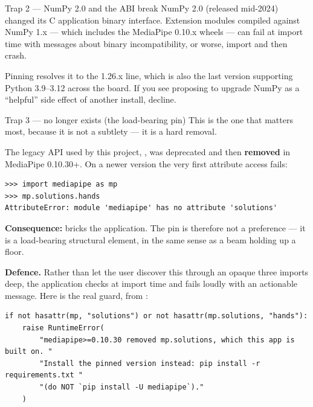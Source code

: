 \begin{edgetrap}{Trap 2 --- NumPy 2.0 and the ABI break}
NumPy 2.0 (released mid-2024) changed its C application binary interface. Extension modules compiled
against NumPy 1.x --- which includes the MediaPipe 0.10.x wheels --- can fail at import time with
messages about binary incompatibility, or worse, import and then crash.

Pinning  resolves it to the 1.26.x line, which is also the last version supporting
Python 3.9--3.12 across the board. If you see  proposing to upgrade NumPy as a
``helpful'' side effect of another install, decline.
\end{edgetrap}

\begin{edgetrap}{Trap 3 ---  no longer exists (the load-bearing pin)}
This is the one that matters most, because it is not a subtlety --- it is a hard removal.

The legacy API used by this project, , was deprecated and then
\textbf{removed} in MediaPipe 0.10.30+. On a newer version the very first attribute access fails:

\begin{lstlisting}
>>> import mediapipe as mp
>>> mp.solutions.hands
AttributeError: module 'mediapipe' has no attribute 'solutions'
\end{lstlisting}

\textbf{Consequence:}  bricks the application. The pin
 is therefore not a preference --- it is a load-bearing structural element,
in the same sense as a beam holding up a floor.

\textbf{Defence.} Rather than let the user discover this through an opaque
 three imports deep, the application checks at import time and fails loudly with
an actionable message. Here is the real guard, from :

\begin{codecard}
\begin{lstlisting}
if not hasattr(mp, "solutions") or not hasattr(mp.solutions, "hands"):
    raise RuntimeError(
        "mediapipe>=0.10.30 removed mp.solutions, which this app is built on. "
        "Install the pinned version instead: pip install -r requirements.txt "
        "(do NOT `pip install -U mediapipe`)."
    )
\end{lstlisting}
\end{codecard}


\end{edgetrap}
